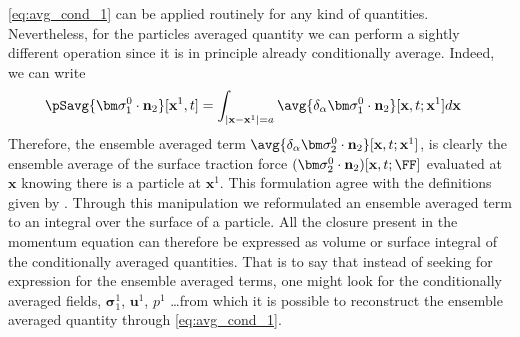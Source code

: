 \ref{eq:avg_cond_1} can be applied routinely for any kind of quantities. 
Nevertheless, for the particles averaged quantity we can perform a sightly different operation since it is in principle already conditionally average. 
Indeed, we can write
\begin{align}
    \pSavg{\bm\sigma_1^0\cdot\textbf{n}_2}[\textbf{x}^1,t]
    &=
    \int_{|\textbf{x}-\textbf{x}^1|=a}
    \avg{\delta_\alpha  \bm\sigma_1^0\cdot \textbf{n}_2}
    [\textbf{x},t;\textbf{x}^1]
    d\textbf{x}
    \label{eq:conditional_sphere}
\end{align}
Therefore, the ensemble averaged term $\avg{\delta_\alpha \bm\sigma_2^0\cdot \textbf{n}_2}
[\textbf{x},t;\textbf{x}^1]$, is clearly the ensemble average of the surface traction force $(\bm\sigma_2^0\cdot \textbf{n}_2)[\textbf{x},t;\FF]$ evaluated at $\textbf{x}$ knowing there is a particle at $\textbf{x}^1$.
This formulation agree with the definitions given by \citet{hinch1977averaged}. 
Through this manipulation we reformulated an ensemble averaged term to an integral over the surface of a particle. 
All the closure present in the momentum equation can therefore be expressed as volume or surface integral of the conditionally averaged quantities.
That is to say that instead of seeking for expression for the ensemble averaged terms, one might look for the conditionally averaged fields, $\bm\sigma^1_1$, $\textbf{u}^1$, $p^1$ \ldots from which it is possible to reconstruct the ensemble averaged quantity through \ref{eq:avg_cond_1}. 

